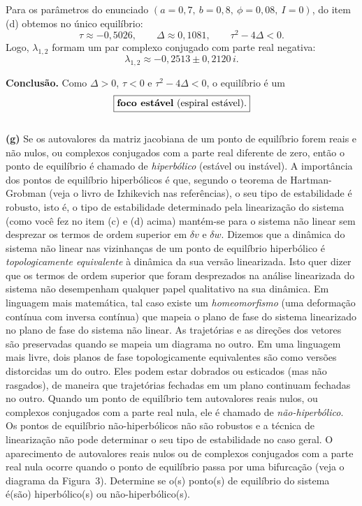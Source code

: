 \documentclass[english,11pt,a4paper]{article}
\begin{document}
	\noindent Para os parâmetros do enunciado \((a=0{,}7,\ b=0{,}8,\ \phi=0{,}08,\ I=0)\), do item (d) obtemos no único equilíbrio:
	\[
	\tau \approx -0{,}5026,\qquad \Delta \approx 0{,}1081,\qquad \tau^2-4\Delta<0.
	\]
	Logo, \(\lambda_{1,2}\) formam um par complexo conjugado com parte real negativa:
	\[
	\lambda_{1,2}\approx -0{,}2513 \pm 0{,}2120\,i .
	\]
	
	\noindent \textbf{Conclusão.} Como \(\Delta>0\), \(\tau<0\) e \(\tau^2-4\Delta<0\), o equilíbrio é um
	\[
	\boxed{\text{\textbf{foco estável} (espiral estável).}}
	\]\\
	
	\noindent\textbf{(g)} Se os autovalores da matriz jacobiana de um ponto de equilíbrio forem reais e não nulos, ou complexos conjugados com a parte real diferente de zero, então o ponto de equilíbrio é chamado de \textit{hiperbólico} (estável ou instável). A importância dos pontos de equilíbrio hiperbólicos é que, segundo o teorema de Hartman-Grobman (veja o livro de Izhikevich nas referências), o seu tipo de estabilidade é robusto, isto é, o tipo de estabilidade determinado pela linearização do sistema (como você fez no item (c) e (d) acima) mantém-se para o sistema não linear sem desprezar os termos de ordem superior em $\delta v$ e $\delta w$. Dizemos que a dinâmica do sistema não linear nas vizinhanças de um ponto de equilíbrio hiperbólico é \textit{topologicamente equivalente} à dinâmica da sua versão linearizada. Isto quer dizer que os termos de ordem superior que foram desprezados na análise linearizada do sistema não desempenham qualquer papel qualitativo na sua dinâmica. Em linguagem mais matemática, tal caso existe um \textit{homeomorfismo} (uma deformação contínua com inversa contínua) que mapeia o plano de fase do sistema linearizado no plano de fase do sistema não linear. As trajetórias e as direções dos vetores são preservadas quando se mapeia um diagrama no outro. Em uma linguagem mais livre, dois planos de fase topologicamente equivalentes são como versões distorcidas um do outro. Eles podem estar dobrados ou esticados (mas não rasgados), de maneira que trajetórias fechadas em um plano continuam fechadas no outro. Quando um ponto de equilíbrio tem autovalores reais nulos, ou complexos conjugados com a parte real nula, ele é chamado de \textit{não-hiperbólico}. Os pontos de equilíbrio não-hiperbólicos não são robustos e a técnica de linearização não pode determinar o seu tipo de estabilidade no caso geral. O aparecimento de autovalores reais nulos ou de complexos conjugados com a parte real nula ocorre quando o ponto de equilíbrio passa por uma bifurcação (veja o diagrama da Figura~3). Determine se o(s) ponto(s) de equilíbrio do sistema é(são) hiperbólico(s) ou não-hiperbólico(s).\\
	
\end{document}
